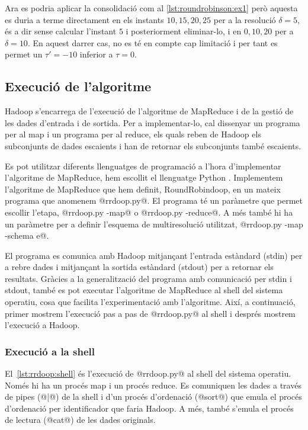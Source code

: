 Ara es podria aplicar la consolidació com al
\autoref{lst:roundrobinson:ex1} però aquesta es duria a terme
directament en els instants $10, 15, 20, 25$ per a la resolució
$\delta=5$, és a dir sense calcular l'instant $5$ i posteriorment
eliminar-lo, i en $0, 10, 20$ per a $\delta=10$. En aquest darrer cas,
no es té en compte cap limitació i per tant es permet un $\tau'=-10$
inferior a $\tau=0$.





\subsection{Execució de l'algoritme}


Hadoop s'encarrega de l'execució de l'algoritme de MapReduce i de la
gestió de les dades d'entrada i de sortida.  Per a implementar-lo, cal
dissenyar un programa per al map i un programa per al reduce, els
quals reben de Hadoop els subconjunts de dades escaients i han de
retornar els subconjunts també escaients.  

Es pot utilitzar diferents llenguatges de programació a l'hora
d'implementar l'algoritme de MapReduce, hem escollit el llenguatge
Python \parencite{python:doc2}.  Implementem l'algoritme de MapReduce
que hem definit, RoundRobindoop, en un mateix programa que anomenem
@rrdoop.py@. El programa té un paràmetre que permet escollir l'etapa,
@rrdoop.py -map@ o @rrdoop.py -reduce@. A més també hi ha un paràmetre
per a definir l'esquema de multiresolució utilitzat, %
@rrdoop.py -map -schema e@.

El programa es comunica amb Hadoop mitjançant l'entrada estàndard
(stdin) per a rebre dades i mitjançant la sortida estàndard (stdout)
per a retornar els resultats.  Gràcies a la generalització del
programa amb comunicació per stdin i stdout, també es pot executar
l'algoritme de MapReduce al shell del sistema operatiu, cosa que
facilita l'experimentació amb l'algoritme.  Així, a continuació,
primer mostrem l'execució pas a pas de @rrdoop.py@ al shell i després
mostrem l'execució a Hadoop.



\subsubsection{Execució a la shell}

El~\autoref{lst:rrdoop:shell} és l'execució de
@rrdoop.py@ al shell del sistema operatiu. Només hi ha un procés map i
un procés reduce. Es comuniquen les dades a través de pipes (@|@) de la
shell i d'un procés d'ordenació (@sort@) que emula el procés
d'ordenació per identificador que faria Hadoop. A més, també s'emula
el procés de lectura (@cat@) de les dades originals.

